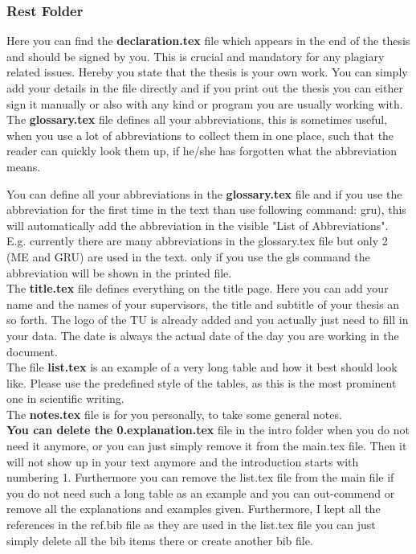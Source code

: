 \subsubsection{Rest Folder}
Here you can find the \textbf{declaration.tex} file which appears in the end of the thesis and should be signed by you. This is crucial and mandatory for any plagiary related issues. Hereby you state that the thesis is your own work. You can simply add your details in the file directly and if you print out the thesis you can either sign it manually or also with any kind or program you are usually working with.\\

The \textbf{glossary.tex} file defines all your abbreviations, this is sometimes useful, when you use a lot of abbreviations to collect them in one place, such that the reader can quickly look them up, if he/she has forgotten what the abbreviation means.

You can define all your abbreviations in the \textbf{glossary.tex} file and if you use the abbreviation for the first time in the text than use following command: \gls{gru}), this will automatically add the abbreviation in the visible "List of Abbreviations". 
E.g. currently there are many abbreviations in the glossary.tex file but only 2 (ME and GRU) are used in the text. only if you use the gls command the abbreviation will be shown in the printed file. \\

The \textbf{title.tex} file defines everything on the title page. Here you can add your name and the names of your supervisors, the title and subtitle of your thesis an so forth. The logo of the TU is already added and you actually just need to fill in your data. The date is always the actual date of the day you are working in the document. \\

The file \textbf{list.tex} is an example of a very long table and how it best should look like. Please use the predefined style of the tables, as this is the most prominent one in scientific writing. \\

The \textbf{notes.tex} file is for you personally, to take some general notes.\\


\textbf{You can delete the 0.explanation.tex} file in the intro folder when you do not need it anymore, or you can just simply remove it from the main.tex file. Then it will not show up in your text anymore and the introduction starts with numbering 1. Furthermore you can remove the list.tex file from the main file if you do not need such a long table as an example and you can out-commend or remove all the explanations and examples given. Furthermore, I kept all the references in the ref.bib file as they are used in the list.tex file you can just simply delete all the bib items there or create another bib file.
